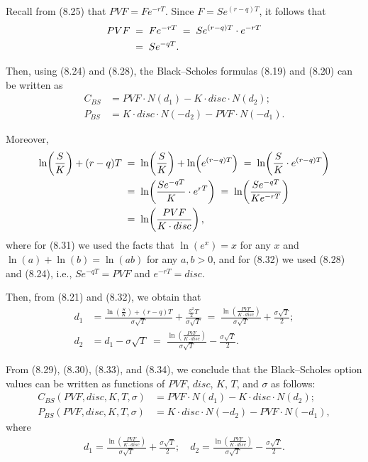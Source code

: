 
Recall from (8.25) that $PVF = Fe^{-rT}$. Since $F = Se^{(r-q)T}$, it follows that
\begin{align}
PVF \;&=\; Fe^{-rT} \;=\; Se^{(r-q)T}\cdot e^{-rT} \notag\\
&=\; Se^{-qT}.
\end{align}

Then, using (8.24) and (8.28), the Black--Scholes formulas (8.19) and (8.20) can be
written as
\begin{align}
C_{BS} &= PVF \cdot N(d_1) - K \cdot disc \cdot N(d_2); \\
P_{BS} &= K \cdot disc \cdot N(-d_2) - PVF \cdot N(-d_1).
\end{align}

Moreover,
\begin{align}
\ln\!\left(\frac{S}{K}\right) + (r-q)T \;&=\; \ln\!\left(\frac{S}{K}\right) +
\ln\!\left(e^{(r-q)T}\right) \;=\; \ln\!\left(\frac{S}{K}\cdot e^{(r-q)T}\right) \\
&=\; \ln\!\left(\frac{Se^{-qT}}{K}\cdot e^{rT}\right) \;=\;
\ln\!\left(\frac{Se^{-qT}}{Ke^{-rT}}\right) \notag\\
&=\; \ln\!\left(\frac{PVF}{K \cdot disc}\right),
\end{align}
where for (8.31) we used the facts that $\ln(e^x) = x$ for any $x$ and
$\ln(a) + \ln(b) = \ln(ab)$ for any $a,b>0$, and for (8.32) we used (8.28) and (8.24),
i.e., $Se^{-qT} = PVF$ and $e^{-rT} = disc$.

Then, from (8.21) and (8.32), we obtain that
\begin{align}
d_1 &= \frac{\ln\left(\frac{S}{K}\right)+(r-q)T}{\sigma\sqrt{T}} +
\frac{\frac{\sigma^2}{2}T}{\sigma\sqrt{T}} \;=\; \frac{\ln\left(\frac{PVF}{K\cdot
disc}\right)}{\sigma\sqrt{T}} + \frac{\sigma\sqrt{T}}{2}; \\
d_2 &= d_1 - \sigma\sqrt{T} \;=\; \frac{\ln\left(\frac{PVF}{K\cdot
disc}\right)}{\sigma\sqrt{T}} - \frac{\sigma\sqrt{T}}{2}.
\end{align}

From (8.29), (8.30), (8.33), and (8.34), we conclude that the Black--Scholes option
values can be written as functions of $PVF$, $disc$, $K$, $T$, and $\sigma$ as follows:
\begin{align}
C_{BS}(PVF,disc,K,T,\sigma) &= PVF \cdot N(d_1) - K \cdot disc \cdot N(d_2); \\
P_{BS}(PVF,disc,K,T,\sigma) &= K \cdot disc \cdot N(-d_2) - PVF \cdot N(-d_1),
\end{align}
where
\begin{align}
d_1 = \frac{\ln\left(\frac{PVF}{K\cdot disc}\right)}{\sigma\sqrt{T}} +
\frac{\sigma\sqrt{T}}{2}; \quad
d_2 = \frac{\ln\left(\frac{PVF}{K\cdot disc}\right)}{\sigma\sqrt{T}} -
\frac{\sigma\sqrt{T}}{2}.
\end{align}

